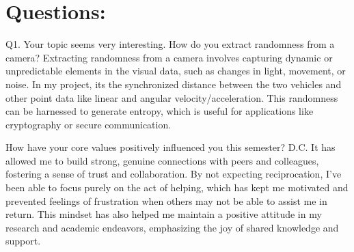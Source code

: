 \documentclass{article}
\begin{document}
\section*{Questions: }

Q1. Your topic seems very interesting. How do you extract randomness from a camera?
Extracting randomness from a camera involves capturing dynamic or unpredictable elements in the visual data, such as changes in light, movement, or noise. In my project, its the synchronized distance between the two vehicles and other point data like linear and angular velocity/acceleration. This randomness can be harnessed to generate entropy, which is useful for applications like cryptography or secure communication.

How have your core values positively influenced you this semester? D.C.
It has allowed me to build strong, genuine connections with peers and colleagues, fostering a sense of trust and collaboration. By not expecting reciprocation, I’ve been able to focus purely on the act of helping, which has kept me motivated and prevented feelings of frustration when others may not be able to assist me in return. This mindset has also helped me maintain a positive attitude in my research and academic endeavors, emphasizing the joy of shared knowledge and support.
\end{document}
